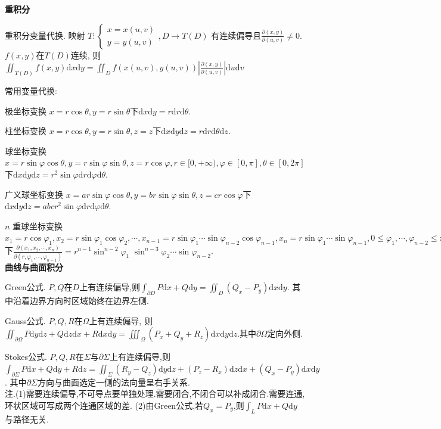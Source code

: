 \documentclass[UTF8]{ctexart}
\begin{document}
\noindent \textbf{重积分}

重积分变量代换. 映射
$T: \left\{\begin{matrix} x=x(u,v) \\y=y(u,v) \end{matrix}\right., D\to T(D)$
有连续偏导且$\frac{\partial(x,y)}{\partial(u,v)}\neq 0$.
$f(x,y)$在$T(D)$连续, 则
$\iint_{T(D)}f(x,y)\mathrm{d}x\mathrm{d}y=\iint_{D} f(x(u,v), y(u,v))
\left|\frac{\partial(x,y)}{\partial(u,v)}\right| \mathrm{d}u\mathrm{d}v$


\noindent 常用变量代换:\par
极坐标变换 $x=r\cos\theta,y=r\sin\theta$下$\mathrm{d}x\mathrm{d}y=r\mathrm{d}r\mathrm{d}\theta$.\par
柱坐标变换 $x=r\cos\theta,y=r\sin\theta,z=z$下$\mathrm{d}x\mathrm{d}y\mathrm{d}z=r\mathrm{d}r\mathrm{d}\theta\mathrm{d}z$.\par
球坐标变换 $x=r\sin\varphi\cos\theta,y=r\sin\varphi\sin\theta,z=r\cos\varphi,
	r\in[0,+\infty),\varphi\in[0,\pi],\theta\in[0,2\pi]$下$\mathrm{d}x\mathrm{d}y\mathrm{d}z
	=r^2\sin\varphi \mathrm{d}r\mathrm{d}\varphi \mathrm{d}\theta$.\par
广义球坐标变换 $x=ar\sin\varphi\cos\theta,y=br\sin\varphi\sin\theta,z=cr\cos\varphi$下$\mathrm{d}x\mathrm{d}y\mathrm{d}z
	=abcr^2\sin\varphi \mathrm{d}r\mathrm{d}\varphi \mathrm{d}\theta$.\par
$n$ 重球坐标变换 $x_{1}=r \cos \varphi_{1}, x_{2}=r \sin \varphi_{1} \cos \varphi_{2}, \cdots,
	x_{n-1}=r \sin \varphi_{1}\cdots \sin \varphi_{n-2} \cos \varphi_{n-1},
	x_{n}=r \sin \varphi_{1}\cdots\sin \varphi_{n-1},
	0\leq \varphi_1,\cdots,\varphi_{n-2}\leq \pi,0\leq \varphi_{n-1}\leq 2\pi$下$
	\frac{\partial\left(x_{1}, x_{2}, \cdots, x_{n}\right)}{\partial\left(r, \varphi_{1}, \cdots, \varphi_{n-1}\right)}=
	r^{n-1} \sin ^{n-2} \varphi_{1}$
$\sin ^{n-3} \varphi_{2} \cdots \sin \varphi_{n-2} $. \\


\noindent \textbf{曲线与曲面积分} \par 
\noindent Green公式. $P,Q$在$D$上有连续偏导,则$\int _{\partial D}P\mathrm{d}x+Q\mathrm{d}y=\iint_D (Q_x-P_y)\mathrm{d}x\mathrm{d}y$.
其中沿着边界方向时区域始终在边界左侧.\par 
\noindent Gauss公式. $P,Q,R$在$\Omega $上有连续偏导,
则$\iint _{\partial \Omega}P\mathrm{d}y\mathrm{d}z+Q\mathrm{d}z\mathrm{d}x+R\mathrm{d}x\mathrm{d}y=
\iiint_{\Omega} (P_x+Q_y+R_z)\mathrm{d}x\mathrm{d}y\mathrm{d}z$.其中$\partial \Omega$定向外侧. \par 
\noindent Stokes公式.  $P,Q,R$在$\Sigma$与$\partial \Sigma$上有连续偏导,则
$\int _{\partial \Sigma}P\mathrm{d}x+Q\mathrm{d}y+R\mathrm{d}z=
\iint_{\Sigma} (R_y-Q_z)\mathrm{d}y\mathrm{d}z+(P_z-R_x)\mathrm{d}z\mathrm{d}x+(Q_x-P_y)\mathrm{d}x\mathrm{d}y$.
其中$\partial \Sigma$方向与曲面选定一侧的法向量呈右手关系. \\
\noindent 注.\quad (1)需要连续偏导,不可导点要单独处理.需要闭合,不闭合可以补成闭合.需要连通,环状区域可写成两个连通区域的差.\quad 
(2)由Green公式,若$Q_x=P_y$,则$\int _L P \mathrm{d}x+Q \mathrm{d}y$与路径无关.\\
\end{document}
